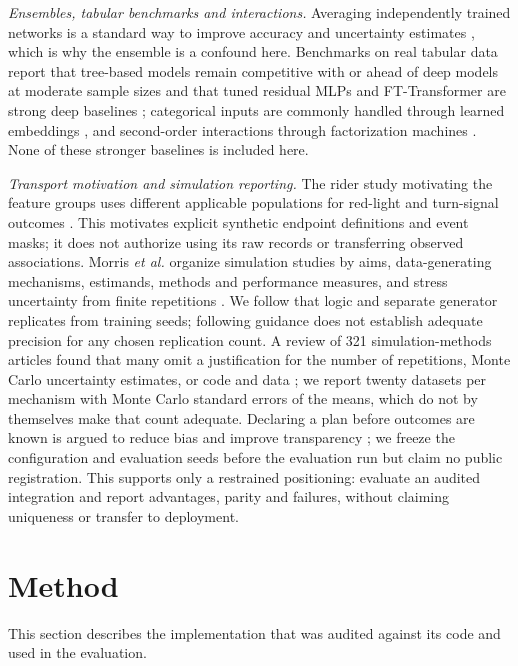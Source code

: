\documentclass[9pt, conference, a4paper, compsocconf]{IEEEtran}
\begin{document}
\textit{Ensembles, tabular benchmarks and interactions.} Averaging independently trained networks is a standard way to improve accuracy and uncertainty estimates \cite{Lakshminarayanan2017simple}, which is why the ensemble is a confound here. Benchmarks on real tabular data report that tree-based models remain competitive with or ahead of deep models at moderate sample sizes \cite{Grinsztajn2022why} and that tuned residual MLPs and FT-Transformer are strong deep baselines \cite{Gorishniy2021revisiting}; categorical inputs are commonly handled through learned embeddings \cite{Guo2016entity}, and second-order interactions through factorization machines \cite{Rendle2010factorization}. None of these stronger baselines is included here.

\textit{Transport motivation and simulation reporting.} The rider study motivating the feature groups uses different applicable populations for red-light and turn-signal outcomes \cite{NguyenPhuoc2024same}. This motivates explicit synthetic endpoint definitions and event masks; it does not authorize using its raw records or transferring observed associations. Morris \emph{et al.} organize simulation studies by aims, data-generating mechanisms, estimands, methods and performance measures, and stress uncertainty from finite repetitions \cite{Morris2019using}. We follow that logic and separate generator replicates from training seeds; following guidance does not establish adequate precision for any chosen replication count. A review of 321 simulation-methods articles found that many omit a justification for the number of repetitions, Monte Carlo uncertainty estimates, or code and data \cite{Siepe2024simulation}; we report twenty datasets per mechanism with Monte Carlo standard errors of the means, which do not by themselves make that count adequate. Declaring a plan before outcomes are known is argued to reduce bias and improve transparency \cite{Hardwicke2023reducing}; we freeze the configuration and evaluation seeds before the evaluation run but claim no public registration. This supports only a restrained positioning: evaluate an audited integration and report advantages, parity and failures, without claiming uniqueness or transfer to deployment.

\section{Method}
This section describes the implementation that was audited against its code and used in the evaluation.
\end{document}
